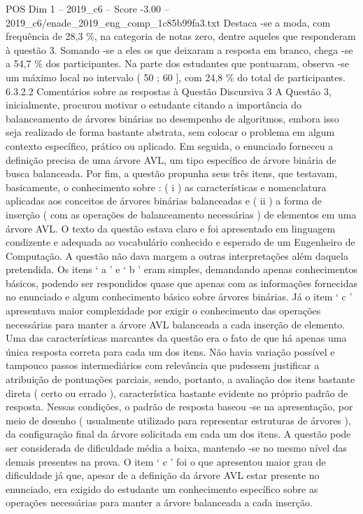 \begin{textsample}{POS Dim 1 – 2019\_c6 – Score -3.00 – 2019\_c6/enade\_2019\_eng\_comp\_1c85b99fa3.txt}
Destaca -se a moda, com frequência de 28,3 \%, na categoria de notas zero, dentre aqueles que responderam à questão 3.
Somando -se a eles os que deixaram a resposta em branco, chega -se a 54,7 \% dos participantes.
Na parte dos estudantes que pontuaram, observa -se um máximo local no intervalo ( 50 ; 60 ], com 24,8 \% do total de participantes. 6.3.2.2 Comentários sobre as respostas à Questão Discursiva 3 A Questão 3, inicialmente, procurou motivar o estudante citando a importância do balanceamento de árvores binárias no desempenho de algoritmos, embora isso seja realizado de forma bastante abstrata, sem colocar o problema em algum contexto específico, prático ou aplicado.
Em seguida, o enunciado forneceu a definição precisa de uma árvore AVL, um tipo específico de árvore binária de busca balanceada.
Por fim, a questão propunha seus três itens, que testavam, basicamente, o conhecimento sobre : ( i ) as características e nomenclatura aplicadas aos conceitos de árvores binárias balanceadas e ( ii ) a forma de inserção ( com as operações de balanceamento necessárias ) de elementos em uma árvore AVL.
O texto da questão estava claro e foi apresentado em linguagem condizente e adequada ao vocabulário conhecido e esperado de um Engenheiro de Computação.
A questão não dava margem a outras interpretações além daquela pretendida.
Os itens ‘ a ’ e ‘ b ’ eram simples, demandando apenas conhecimentos básicos, podendo ser respondidos quase que apenas com as informações fornecidas no enunciado e algum conhecimento básico sobre árvores binárias.
Já o item ‘ c ’ apresentava maior complexidade por exigir o conhecimento das operações necessárias para manter a árvore AVL balanceada a cada inserção de elemento.
Uma das características marcantes da questão era o fato de que há apenas uma única resposta correta para cada um dos itens.
Não havia variação possível e tampouco passos intermediários com relevância que pudessem justificar a atribuição de pontuações parciais, sendo, portanto, a avaliação dos itens bastante direta ( certo ou errado ), característica bastante evidente no próprio padrão de resposta.
Nessas condições, o padrão de resposta baseou -se na apresentação, por meio de desenho ( usualmente utilizado para representar estruturas de árvores ), da configuração final da árvore solicitada em cada um dos itens.
A questão pode ser considerada de dificuldade média a baixa, mantendo -se no mesmo nível das demais presentes na prova.
O item ‘ c ’ foi o que apresentou maior grau de dificuldade já que, apesar de a definição da árvore AVL estar presente no enunciado, era exigido do estudante um conhecimento específico sobre as operações necessárias para manter a árvore balanceada a cada inserção.

\end{textsample}

